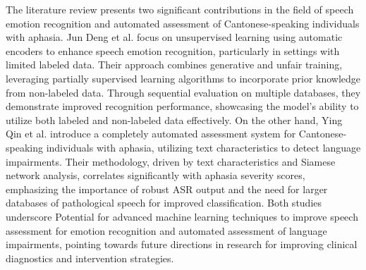 The literature review presents two significant contributions in the field of speech emotion recognition and automated assessment of Cantonese-speaking individuals with aphasia. Jun Deng et al. focus on unsupervised learning using automatic encoders to enhance speech emotion recognition, particularly in settings with limited labeled data. Their approach combines generative and unfair training, leveraging partially supervised learning algorithms to incorporate prior knowledge from non-labeled data. Through sequential evaluation on multiple databases, they demonstrate improved recognition performance, showcasing the model's ability to utilize both labeled and non-labeled data effectively. On the other hand, Ying Qin et al. introduce a completely automated assessment system for Cantonese-speaking individuals with aphasia, utilizing text characteristics to detect language impairments. Their methodology, driven by text characteristics and Siamese network analysis, correlates significantly with aphasia severity scores, emphasizing the importance of robust ASR output and the need for larger databases of pathological speech for improved classification. Both studies underscore Potential for advanced machine learning techniques to improve speech assessment for emotion recognition and automated assessment of language impairments, pointing towards future directions in research for improving clinical diagnostics and intervention strategies.

